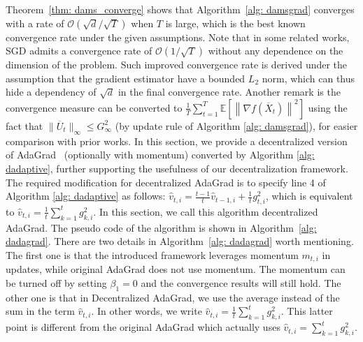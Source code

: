 \documentclass[anon,12pt]{colt2021} %
\begin{document}
Theorem~\ref{thm: dams_converge} shows that Algorithm~\ref{alg: damsgrad} converges with a rate of  $\mathcal{O}(\sqrt{d}/\sqrt{T})$ when $T$ is large, which is the best known convergence rate under the given assumptions. 
Note that in some related works, SGD admits a convergence rate of $\mathcal{O}(1/\sqrt{T})$ without any dependence on the dimension of the problem.
Such improved convergence rate is derived under the assumption that the gradient estimator have a bounded $L_2$ norm, which can thus hide a dependency of $\sqrt{d}$ in the final convergence rate. {Another remark is the convergence measure can be converted to $\frac{1}{T}\sum_{t=1}^T  \mathbb E \left [\left\|{\nabla f( \overline X_{t})}\right\|^2  \right]$
using the fact that $\|\overline U_{t}\|_{\infty} \leq G_{\infty}^2$  (by update rule of Algorithm \ref{alg: damsgrad}), for easier comparison with prior works.}
In this section, we provide a decentralized version of AdaGrad~\cite{duchi2011adaptive} (optionally with momentum) converted by Algorithm \ref{alg: dadaptive}, further supporting the usefulness of our decentralization framework. 
The required modification for decentralized AdaGrad is to specify line 4 of Algorithm \ref{alg: dadaptive} as follows: $ \hat v_{t,i} = \frac{t-1}{t} \hat v_{t-1,i} + \frac{1}{t} g_{t,i}^2 $, which is equivalent to  $\hat v_{t,i} = {\frac{1}{t}\sum_{k=1}^t g_{k,i}^2}$. 
In this section, we call this algorithm decentralized AdaGrad.
The pseudo code of the algorithm is shown in Algorithm~\ref{alg: dadagrad}. 
There are two details in Algorithm~\ref{alg: dadagrad} worth mentioning. 
The first one is that the introduced framework leverages momentum $m_{t,i}$ in updates, while original AdaGrad does not use momentum. 
The momentum can be turned off by setting $\beta_1 = 0$ and the convergence results will still hold. 
The other one is that in Decentralized AdaGrad, we use the average instead of the sum in the term $\hat v_{t,i}$. 
In other words, we write $\hat v_{t,i} = {\frac{1}{t}\sum_{k=1}^t g_{k,i}^2}$. 
This latter point is different from the original AdaGrad which actually uses $\hat v_{t,i} = {\sum_{k=1}^t g_{k,i}^2}$. 
\end{document}
